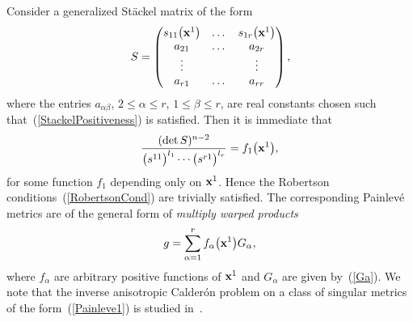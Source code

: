 \documentclass[pdftex]{sigma}
\numberwithin{equation}{section}
\begin{document}
\begin{Example} \label{Exem1}Consider a generalized St\"ackel matrix of the form
\[
S=\left(
\begin{matrix}
s_{11}\big({{\bf x}^{1}}\big)&\dots&s_{1r}\big({{\bf x}^{1}}\big) \\
a_{21}&\dots&a_{2r} \\
\vdots& & \vdots \\
a_{r1}&\dots&a_{rr}
\end{matrix}
\right),
\]
where the entries $a_{\alpha \beta}$, $2\leq \alpha \leq r$, $1\leq \beta \leq r$, are real constants chosen such that~(\ref{StackelPositiveness}) is satisfied. Then it is immediate that
\[
 \frac{(\det S)^{n-2}}{\big(s^{11}\big)^{l_1} \cdots \big(s^{r1}\big)^{l_r}} = f_1\big({\bf x}^1\big),
\]
for some function $f_1$ depending only on ${\bf x}^1$. Hence the Robertson conditions~(\ref{RobertsonCond}) are trivially satisfied. The corresponding Painlev\'e metrics are of the general form of \emph{multiply warped products}
\begin{gather} \label{Painleve1}
 g = \sum_{\alpha =1}^r f_\alpha\big({\bf x}^1\big) G_\alpha,
\end{gather}
where $f_\alpha$ are arbitrary positive functions of ${\bf x}^1$ and $G_\alpha$ are given by~(\ref{Ga}). We note that the inverse anisotropic Calder\'on problem on a class of singular metrics of the form~(\ref{Painleve1}) is studied in~\cite{DKN2018a}.
\end{Example}
\end{document}
